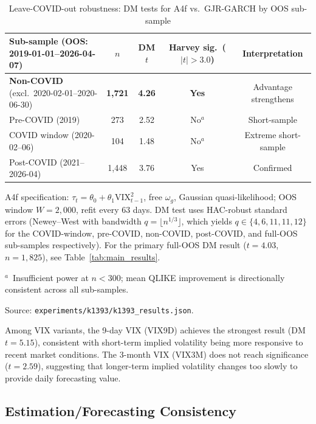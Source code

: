 \documentclass[12pt,a4paper]{article}
\begin{document}
\begin{table}[H]
\centering
\caption{Leave-COVID-out robustness: DM tests for A4f vs.\ GJR-GARCH by OOS sub-sample}
\label{tab:covid_robust}
\begin{threeparttable}
\small
\begin{tabular}{@{}lcccc@{}}
\toprule
Sub-sample (OOS: 2019-01-01--2026-04-07) & $n$ & DM $t$ & Harvey sig.\ ($|t|>3.0$) & Interpretation \\
\midrule
\textbf{Non-COVID} (excl.\ 2020-02-01--2020-06-30) & \textbf{1,721} & \textbf{4.26} & \textbf{Yes} & Advantage strengthens \\
Pre-COVID (2019) & 273 & 2.52 & No$^{a}$ & Short-sample \\
COVID window (2020-02--06) & 104 & 1.48 & No$^{a}$ & Extreme short-sample \\
Post-COVID (2021--2026-04) & 1,448 & 3.76 & Yes & Confirmed \\
\bottomrule
\end{tabular}
\begin{tablenotes}
\footnotesize
\item A4f specification: $\tau_t = \theta_0 + \theta_1 \mathrm{VIX}_{t-1}^2$, free $\omega_g$, Gaussian quasi-likelihood; OOS window $W=2{,}000$, refit every 63 days. DM test uses HAC-robust standard errors (Newey--West with bandwidth $q = \lfloor n^{1/3} \rfloor$, which yields $q \in \{4,6,11,11,12\}$ for the COVID-window, pre-COVID, non-COVID, post-COVID, and full-OOS sub-samples respectively). For the primary full-OOS DM result ($t = 4.03$, $n = 1{,}825$), see Table~\ref{tab:main_results}.
\item $^{a}$~Insufficient power at $n < 300$; mean QLIKE improvement is directionally consistent across all sub-samples.
\item Source: \texttt{experiments/k1393/k1393\_results.json}.
\end{tablenotes}
\end{threeparttable}
\end{table}

Among VIX variants, the 9-day VIX (VIX9D) achieves the strongest result (DM $t = 5.15$), consistent with short-term implied volatility being more responsive to recent market conditions. The 3-month VIX (VIX3M) does not reach significance ($t = 2.59$), suggesting that longer-term implied volatility changes too slowly to provide daily forecasting value.

\subsection{Estimation/Forecasting Consistency}
\end{document}
